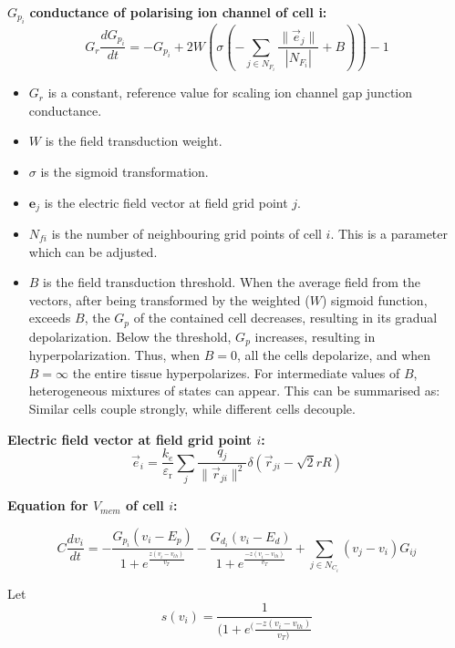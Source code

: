 \documentclass{article}
\begin{document}
\begin{flushleft}
$G_{p_i}$ \textbf{conductance of polarising ion channel of cell i:}
\[
G_r \frac{dG_{p_i}}{dt} = -G_{p_i} + 2W \left( \sigma \left( - \sum_{j \in N_{F_i}} \frac{\|\vec{e}_j\|}{|N_{F_i}|} + B \right) \right) - 1
\]

\begin{itemize}
    \item \textbf{$G_r$} is a constant, reference value for scaling ion channel gap junction conductance.
    \item \textbf{$W$} is the field transduction weight.
    \item \textbf{$\sigma$} is the sigmoid transformation.
    \item \textbf{$\bm{e}_j$} is the electric field vector at field grid point $j$.
    \item \textbf{$N_{fi}$} is the number of neighbouring grid points of cell $i$. This is a parameter which can be adjusted.
    \item \textbf{$B$} is the field transduction threshold. When the average field from the vectors, after being transformed by the weighted ($W$) sigmoid function, exceeds $B$, the \textbf{$G_p$} of the contained cell decreases, resulting in its gradual depolarization. Below the threshold, \textbf{$G_p$} increases, resulting in hyperpolarization. Thus, when \textbf{$B=0$}, all the cells depolarize, and when \textbf{$B=\infty$} the entire tissue hyperpolarizes. For intermediate values of \textbf{$B$}, heterogeneous mixtures of states can appear. This can be summarised as: Similar cells couple strongly, while different cells decouple. 
\end{itemize}

\hfill\break
\hfill\break

\textbf{Electric field vector at field grid point $i$:}
\begin{equation*}
\vec{e}_i = \frac{k_e}{\varepsilon_{\text{r}}} \sum_{j} \frac{q_j}{\|\vec{r}_{ji}\|^2} \delta(\vec{r}_{ji} - \sqrt{2}rR)
\end{equation*}

\hfill\break
\hfill\break

\textbf{Equation for $V_{mem}$ of cell $i$:}

\[
C \frac{dv_i}{dt} = - \frac{G_{p_i}(v_i - E_p)}{1 + e^{\frac{z(v_i - v_{th})}{v_T}}} - \frac{G_{d_i}(v_i - E_d)}{1 + e^{\frac{-z(v_i - v_{th})}{v_T}}} + \sum_{j \in N_{C_i}} (v_j - v_i) G_{ij}
\]

Let
\[ s(v_i)= \frac{1}{(1+e^(\frac{-z(v_i-v_{th})}{v_T)}}\]


\end{flushleft}
\end{document}
